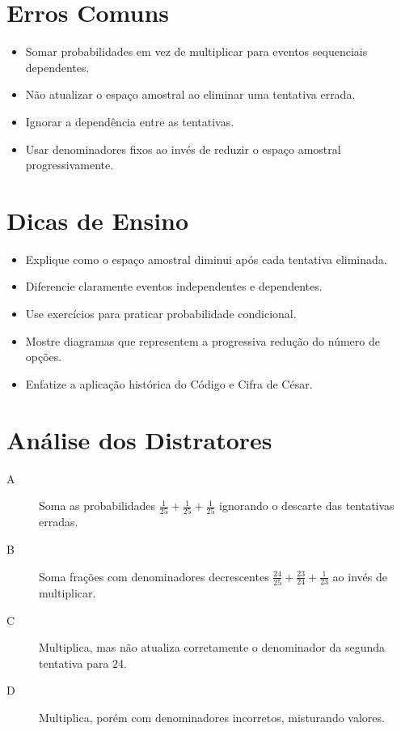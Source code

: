 \documentclass[a4paper,12pt]{article}
\begin{document}
\section*{Erros Comuns}
\begin{itemize}
  \item Somar probabilidades em vez de multiplicar para eventos sequenciais dependentes.
  \item Não atualizar o espaço amostral ao eliminar uma tentativa errada.
  \item Ignorar a dependência entre as tentativas.
  \item Usar denominadores fixos ao invés de reduzir o espaço amostral progressivamente.
\end{itemize}

\section*{Dicas de Ensino}
\begin{itemize}
  \item Explique como o espaço amostral diminui após cada tentativa eliminada.
  \item Diferencie claramente eventos independentes e dependentes.
  \item Use exercícios para praticar probabilidade condicional.
  \item Mostre diagramas que representem a progressiva redução do número de opções.
  \item Enfatize a aplicação histórica do Código e Cifra de César.
\end{itemize}

\section*{Análise dos Distratores}
\begin{description}
  \item[A] Soma as probabilidades $\tfrac{1}{25} + \tfrac{1}{25} + \tfrac{1}{25}$ ignorando o descarte das tentativas erradas.
  \item[B] Soma frações com denominadores decrescentes $\tfrac{24}{25} + \tfrac{23}{24} + \tfrac{1}{23}$ ao invés de multiplicar.
  \item[C] Multiplica, mas não atualiza corretamente o denominador da segunda tentativa para 24.
  \item[D] Multiplica, porém com denominadores incorretos, misturando valores.
\end{description}
\end{document}
